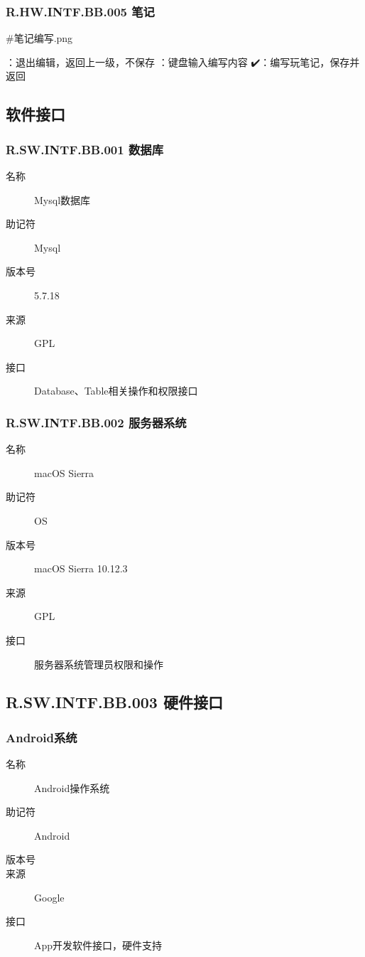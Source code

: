     \subsubsection{R.HW.INTF.BB.005 笔记}
    #笔记编写.png
    \begin{itemize}
  ：退出编辑，返回上一级，不保存
  ：键盘输入编写内容
  \iterm✔️：编写玩笔记，保存并返回
  \end{itemize}


  \subsection{软件接口}

    \subsubsection{R.SW.INTF.BB.001 数据库}
	\begin{center}\begin{description}
      \item[名称] Mysql数据库
      \item[助记符] Mysql
      \item[版本号]5.7.18
	\item[来源] GPL
	\item[接口] Database、Table相关操作和权限接口
	\end{description}\end{center}

    \subsubsection{R.SW.INTF.BB.002 服务器系统}
	\begin{center}\begin{description}
      \item[名称] macOS Sierra
      \item[助记符] OS
      \item[版本号] macOS Sierra 10.12.3
	\item[来源] GPL
	\item[接口] 服务器系统管理员权限和操作
	\end{description}\end{center}

  \subsection{R.SW.INTF.BB.003 硬件接口}
    \subsubsection{Android系统}
	\begin{center}\begin{description}
      \item[名称] Android操作系统
      \item[助记符] Android
      \item[版本号]
	\item[来源] Google
	\item[接口] App开发软件接口，硬件支持
	\end{description}\end{center}

